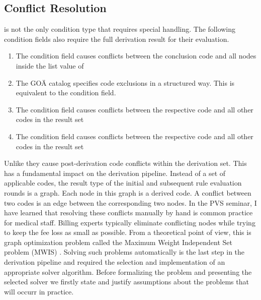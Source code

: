 \subsection{Conflict Resolution}

 is not the only condition type that requires special handling.
The following condition fields also require the full derivation result for their evaluation.
\begin{enumerate}
    \item The condition field  causes conflicts between the conclusion code and all nodes inside the list value of 
    \item The GOÄ catalog specifies code exclusions in a structured way.
    This is equivalent to the  condition field.
    \item The condition field  causes conflicts between the respective code and all other codes in the result set
    \item The condition field  causes conflicts between the respective code and all other codes in the result set
\end{enumerate}
Unlike  they cause post-derivation code conflicts within the derivation set.
This has a fundamental impact on the derivation pipeline.
Instead of a set of applicable codes, the result type of the initial and subsequent rule evaluation rounds is a graph.
Each node in this graph is a derived code.
A conflict between two codes is an edge between the corresponding two nodes.
In the PVS seminar, I have learned that resolving these conflicts manually by hand is common practice for medical staff.
Billing experts typically eliminate conflicting nodes while trying to keep the fee loss as small as possible.
From a theoretical point of view, this is graph optimization problem called the Maximum Weight Independent Set problem (MWIS) \cite{SAKAI2003313}.
Solving such problems automatically is the last step in the derivation pipeline and required the selection and implementation of an appropriate solver algorithm.
Before formalizing the problem and presenting the selected solver we firstly state and justify assumptions about the problems that will occurr in practice.

